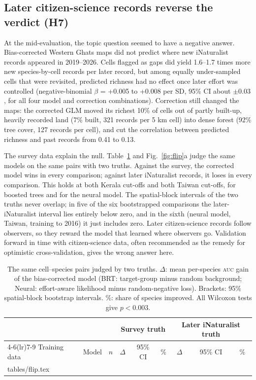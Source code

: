 \documentclass[11pt]{article}
\makeatletter
\newcommand{\tabinput}[1]{\@@input #1 }
\newcommand{\auc}{\textsc{auc}}
\makeatother
\begin{document}
\subsection{Later citizen-science records reverse the verdict (H7)}
At the mid-evaluation, the topic question seemed to have a negative answer. Bias-corrected Western Ghats maps did not predict where new iNaturalist records appeared in 2019--2026. Cells flagged as gaps did yield 1.6--1.7 times more new species-by-cell records per later record, but among equally under-sampled cells that were revisited, predicted richness had no effect once later effort was controlled (negative-binomial $\beta$ = +0.005 to +0.008 per SD, 95\% CI about $\pm0.03$, for all four model and correction combinations). Correction still changed the maps: the corrected GLM moved its richest 10\% of cells out of partly built-up, heavily recorded land (7\% built, 321 records per 5 km cell) into dense forest (92\% tree cover, 127 records per cell), and cut the correlation between predicted richness and past records from 0.41 to 0.13.

The survey data explain the null. Table~\ref{tab:flip} and Fig.~\ref{fig:flip}a judge the same models on the same pairs with two truths. Against the survey, the corrected model wins in every comparison; against later iNaturalist records, it loses in every comparison. This holds at both Kerala cut-offs and both Taiwan cut-offs, for boosted trees and for the neural model. The spatial-block intervals of the two truths never overlap; in five of the six bootstrapped comparisons the later-iNaturalist interval lies entirely below zero, and in the sixth (neural model, Taiwan, training to 2016) it just includes zero. Later citizen-science records follow observers, so they reward the model that learned where observers go. Validation forward in time with citizen-science data, often recommended as the remedy for optimistic cross-validation, gives the wrong answer here.

\begin{table}[htbp]
\centering\small
\caption{The same cell--species pairs judged by two truths. $\Delta$: mean per-species \auc{} gain of the bias-corrected model (BRT: target-group minus random background; Neural: effort-aware likelihood minus random-negative loss). Brackets: 95\% spatial-block bootstrap intervals. \%: share of species improved. All Wilcoxon tests give $p<0.003$.}
\label{tab:flip}
\begin{tabular}{@{}llccccccc@{}}
\toprule
& & & \multicolumn{3}{c}{Survey truth} & \multicolumn{3}{c}{Later iNaturalist truth} \\
\cmidrule(lr){4-6}\cmidrule(lr){7-9}
Training data & Model & $n$ & $\Delta$ & 95\% CI & \% & $\Delta$ & 95\% CI & \% \\
\midrule
\tabinput{tables/flip.tex}
\bottomrule
\end{tabular}
\end{table}
\end{document}
